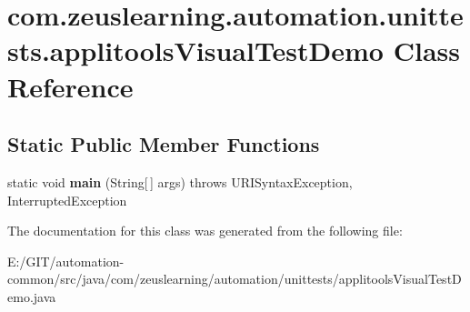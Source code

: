 \hypertarget{classcom_1_1zeuslearning_1_1automation_1_1unittests_1_1applitoolsVisualTestDemo}{}\section{com.\+zeuslearning.\+automation.\+unittests.\+applitools\+Visual\+Test\+Demo Class Reference}
\label{classcom_1_1zeuslearning_1_1automation_1_1unittests_1_1applitoolsVisualTestDemo}
\subsection*{Static Public Member Functions}
\begin{DoxyCompactItemize}
\item 
\hypertarget{classcom_1_1zeuslearning_1_1automation_1_1unittests_1_1applitoolsVisualTestDemo_adb3aa85cda2fc02698c472ed98fb4fda}{}\label{classcom_1_1zeuslearning_1_1automation_1_1unittests_1_1applitoolsVisualTestDemo_adb3aa85cda2fc02698c472ed98fb4fda} 
static void {\bfseries main} (String\mbox{[}$\,$\mbox{]} args)  throws U\+R\+I\+Syntax\+Exception, Interrupted\+Exception 
\end{DoxyCompactItemize}


The documentation for this class was generated from the following file\+:\begin{DoxyCompactItemize}
\item 
E\+:/\+G\+I\+T/automation-\/common/src/java/com/zeuslearning/automation/unittests/applitools\+Visual\+Test\+Demo.\+java\end{DoxyCompactItemize}
